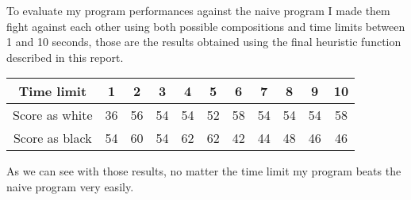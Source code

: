 To evaluate my program performances against the naive program I made them fight against each other using both possible compositions and time limits between 1 and 10 seconds, those are the results obtained using the final heuristic function described in this report.

\begin{center}
    \begin{tabular}{ c | c c c c c c c c c c } 
        Time limit & 1 & 2 & 3 & 4 & 5 & 6 & 7 & 8 & 9 & 10\\
        \hline
        Score as white & 36 & 56 & 54 & 54 & 52 & 58 & 54 & 54 & 54 & 58\\
        Score as black & 54 & 60 & 54 & 62 & 62 & 42 & 44 & 48 & 46 & 46\\
    \end{tabular}
\end{center}

As we can see with those results, no matter the time limit my program beats the naive program very easily.

